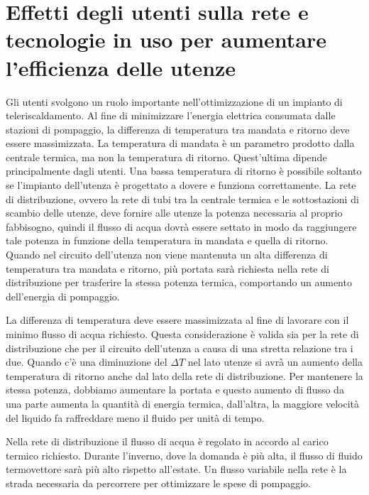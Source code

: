 \documentclass[laurea,oneside,11pt]{USiena_tesiLM}
\begin{document}
\section{Effetti degli utenti sulla rete e tecnologie in uso per aumentare l'efficienza delle utenze}
Gli utenti svolgono un ruolo importante nell'ottimizzazione di un impianto di teleriscaldamento. Al fine di minimizzare l'energia elettrica consumata dalle stazioni di pompaggio, la differenza di temperatura tra mandata e ritorno deve essere massimizzata. La temperatura di mandata è un parametro prodotto dalla centrale termica, ma non la temperatura di ritorno. Quest'ultima dipende principalmente dagli utenti. Una bassa temperatura di ritorno è possibile soltanto se l'impianto dell'utenza è progettato a dovere e funziona correttamente.
La rete di distribuzione, ovvero la rete di tubi tra la centrale termica e le sottostazioni di scambio delle utenze, deve fornire alle utenze la potenza necessaria al proprio fabbisogno, quindi il flusso di acqua dovrà essere settato in modo da raggiungere tale potenza in funzione della temperatura in mandata e quella di ritorno. Quando nel circuito dell'utenza non viene mantenuta un alta differenza di temperatura tra mandata e ritorno, più portata sarà richiesta nella rete di distribuzione per trasferire la stessa potenza termica,
comportando un aumento dell'energia di pompaggio.

La differenza di temperatura deve essere massimizzata al fine di lavorare con il minimo flusso di acqua richiesto. Questa considerazione è valida sia per la rete di distribuzione che per il circuito dell'utenza a causa di una stretta relazione tra i due. 
Quando c'è una diminuzione del $\Delta T$ nel lato utenze si avrà un aumento della temperatura di ritorno anche dal lato della rete di distribuzione. Per mantenere la stessa potenza, dobbiamo aumentare la portata e questo aumento di flusso da una parte aumenta la quantità di energia termica, dall'altra, la maggiore velocità del liquido fa raffreddare meno il fluido per unità di tempo. 

Nella rete di distribuzione il flusso di acqua è regolato in accordo al carico termico richiesto. Durante l'inverno, dove la domanda è più alta, il flusso di fluido termovettore sarà più alto rispetto all'estate. Un flusso variabile nella rete è la strada necessaria da percorrere per ottimizzare le spese di pompaggio.
\end{document}
